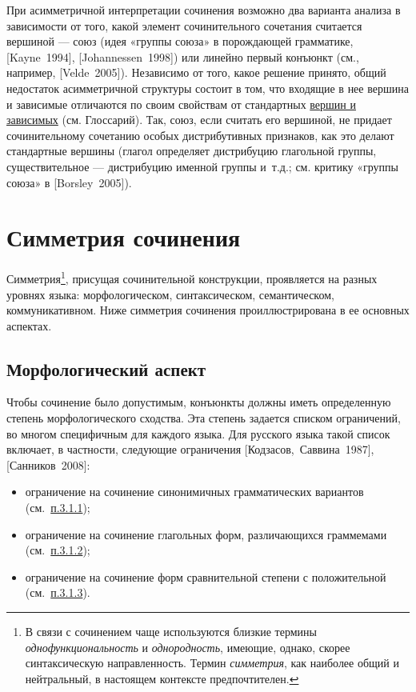 При асимметричной интерпретации сочинения возможно два варианта анализа
в зависимости от того, какой элемент сочинительного сочетания считается
вершиной --- союз (идея «группы союза» в порождающей грамматике,
{[}Kayne~1994{]}, {[}Johannessen~1998{]}) или линейно первый конъюнкт
(см., например, {[}Velde~2005{]}). Независимо от того, какое решение
принято, общий недостаток асимметричной структуры состоит в том, что
входящие в нее вершина и зависимые отличаются по своим свойствам от
стандартных \underline{вершин и зависимых} (см. Глоссарий). Так, союз,
если считать его вершиной, не придает сочинительному сочетанию особых
дистрибутивных признаков, как это делают стандартные вершины (глагол
определяет дистрибуцию глагольной группы, существительное --- дистрибуцию
именной группы и~т.д.; см. критику «группы союза» в {[}Borsley~2005{]}).

\section{Симметрия
  сочинения}\label{ux441ux438ux43cux43cux435ux442ux440ux438ux44f-ux441ux43eux447ux438ux43dux435ux43dux438ux44f}

Симметрия\footnote{В связи с сочинением чаще используются близкие
  термины \textit{однофункциональность} и \textit{однородность}, имеющие,
  однако, скорее синтаксическую направленность. Термин \textit{симметрия},
  как наиболее общий и нейтральный, в настоящем контексте
  предпочтителен.}, присущая сочинительной конструкции, проявляется на
разных уровнях языка: морфологическом, синтаксическом, семантическом,
коммуникативном. Ниже симметрия сочинения проиллюстрирована в ее
основных аспектах.

\subsection{Морфологический
  аспект}\label{ux43cux43eux440ux444ux43eux43bux43eux433ux438ux447ux435ux441ux43aux438ux439-ux430ux441ux43fux435ux43aux442}

Чтобы сочинение было допустимым, конъюнкты должны иметь определенную
степень морфологического сходства. Эта степень задается списком
ограничений, во многом специфичным для каждого языка. Для русского языка
такой список включает, в частности, следующие ограничения
{[}Кодзасов,~Саввина~1987{]}, {[}Санников~2008{]}:

\begin{itemize}
  \item
        ограничение на сочинение синонимичных грамматических вариантов
        (см.~\underline{п.3.1.1});
  \item
        ограничение на сочинение глагольных форм, различающихся граммемами
        (см.~\underline{п.3.1.2});
  \item
        ограничение на сочинение форм сравнительной степени с положительной
        (см.~\underline{п.3.1.3}).
\end{itemize}

